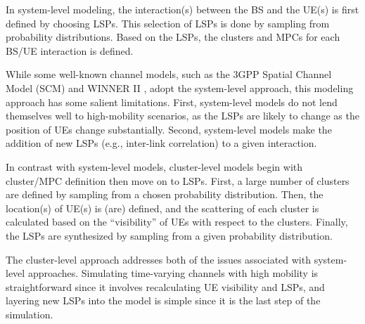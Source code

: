 In system-level modeling, the interaction(s) between the BS and the UE(s) is first defined by choosing LSPs. This selection of LSPs is done by sampling from probability distributions. Based on the LSPs, the clusters and MPCs for each BS/UE interaction is defined.

While some well-known channel models, such as the 3GPP Spatial Channel Model (SCM) \cite{ref:3gpp.25.996} and  WINNER II \cite{ref:kyosti2007winner}, adopt the system-level approach, this modeling approach has some salient limitations. First, system-level models do not lend themselves well to high-mobility scenarios, as the LSPs are likely to change as the position of UEs change substantially. Second, system-level models make the addition of new LSPs (e.g., inter-link correlation) to a given interaction.

In contrast with system-level models, cluster-level models begin with cluster/MPC definition then move on to LSPs. First, a large number of clusters are defined by sampling from a chosen probability distribution. Then, the location(s) of UE(s) is (are) defined, and the scattering of each cluster is calculated based on the ``visibility'' of UEs with respect to the clusters. Finally, the LSPs are synthesized by sampling from a given probability distribution.

The cluster-level approach addresses both of the issues associated with system-level approaches. Simulating time-varying channels with high mobility is straightforward since it involves recalculating UE visibility and LSPs, and layering new LSPs into the model is simple since it is the last step of the simulation.

